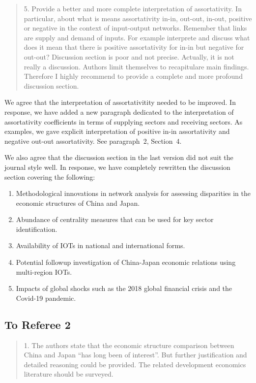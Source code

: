 \documentclass[12pt]{article}
\newenvironment{comment}%
{\begin{quotation}\noindent\small\it\color{darkblue}\ignorespaces%
}{\end{quotation}}
\begin{document}
\begin{comment}
5. Provide a better and more complete interpretation of assortativity. In
particular, about what is means assortativity in-in, out-out, in-out, positive
or negative in the context of input-output networks. Remember that links are
supply and demand of inputs. For example interprete and discuss what does it 
mean that there is positive assortativity for in-in but negative for out-out?
Discussion section is poor and not precise. Actually, it is not really a
discussion. Authors limit themselves to recapitulare main findings. Therefore I
highly recommend to provide a complete and more profound discussion section.
\end{comment}

We agree that the interpretation of assortativitity needed to be improved. In
response, we have added a new paragraph dedicated to the interpretation of
assortativity coefficients in terms of supplying sectors and receiving sectors.
As examples, we gave explicit interpretation
of positive in-in assortativity and negative out-out assortativity. See
paragraph~2, Section~4. 


We also agree that the discussion section in the last version did not suit the
journal style well. In response, we have completely rewritten the discussion
section covering the following:
\begin{enumerate}
\item
  Methodological innovations in network analysis for assessing 
  disparities in the economic structures of China and Japan.
\item
  Abundance of centrality measures that can be used for key sector
  identification.
\item
  Availability of IOTs in national and international forms.
\item
  Potential followup investigation of China-Japan economic relations using
  multi-region IOTs.
\item
  Impacts of global shocks such as the 2018 global financial crisis and the
  Covid-19 pandemic.
\end{enumerate}


\subsection*{To Referee 2}

\begin{comment}
1. The authors state that the economic structure comparison between China and
Japan ``has long been of interest''. But further justification and detailed
reasoning could be provided. The related development economics literature
should be surveyed.
\end{comment}
\end{document}
